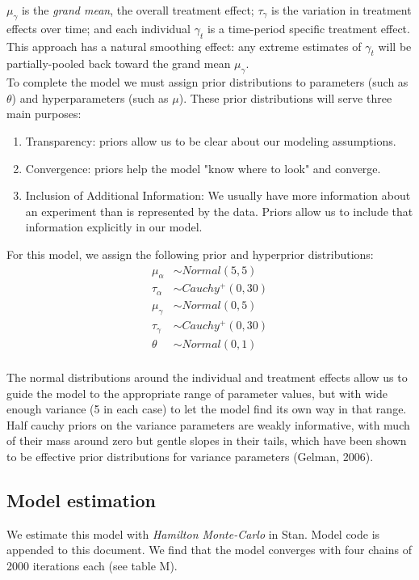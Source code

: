 \documentclass[12pt, oneside]{article}
\begin{document}
$\mu_{\gamma}$ is the \emph{grand mean}, the overall treatment effect; $\tau_{\gamma}$ is the variation in treatment effects over time; and each individual $\gamma_t$ is a time-period specific treatment effect.  This approach has a natural smoothing effect: any extreme estimates of $\gamma_t$ will be partially-pooled back toward the grand mean $\mu_{\gamma}$.
\\

To complete the model we must assign prior distributions to parameters (such as $\theta$) and hyperparameters (such as $\mu$).  These prior distributions will serve three main purposes:
\begin{enumerate}
\item{Transparency: priors allow us to be clear about our modeling assumptions.}
\item{Convergence: priors help the model "know where to look" and converge.}
\item{Inclusion of Additional Information: We usually have more information about an experiment than is represented by the data.  Priors allow us to include that information explicitly in our model.}
\end{enumerate}

For this model, we assign the following prior and hyperprior distributions:
\begin{align}
\mu_{\alpha} &\sim Normal(5, 5) \\
\tau_{\alpha} &\sim Cauchy^+(0, 30) \\
\mu_{\gamma} &\sim Normal(0, 5) \\
\tau_{\gamma} &\sim Cauchy^+(0, 30) \\
\theta &\sim Normal(0, 1) \\
\end{align}

The normal distributions around the individual and treatment effects allow us to guide the model to the appropriate range of parameter values, but with wide enough variance (5 in each case) to let the model find its own way in that range.  Half cauchy priors on the variance parameters are weakly informative, with much of their mass around zero but gentle slopes in their tails, which have been shown to be effective prior distributions for variance parameters (Gelman, 2006).

\subsection{Model estimation}
We estimate this model with \emph{Hamilton Monte-Carlo} in Stan.  Model code is appended to this document.  We find that the model converges with four chains of 2000 iterations each (see table M).  
\end{document}

